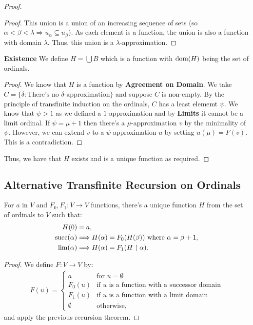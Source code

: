 \begin{proof}
    \begin{proof}
        This union is a union of an increasing sequence of sets
        (so \linebreak 
        $\alpha < \beta < \lambda \Rightarrow u_\alpha \subseteq u_\beta$).
        As each element is a function, the union is also a function with
        domain $\lambda$. Thus, this union is a $\lambda$-approximation.
    \end{proof}
    \vspace{3mm}\noindent
    \textbf{Existence} \newline
    We define $H = \bigcup B$ which is a function with $\operatorname{dom}(H)$ being the set
    of ordinals.
    \begin{proof}
        We know that $H$ is a function by \textbf{Agreement on Domain}.
        We take $C = \{\delta : \text{There's no $\delta$-approximation}\}$
        and suppose $C$ is non-empty. By the principle of transfinite induction
        on the ordinals, $C$ has a least elememt $\psi$. We know that
        $\psi > 1$ as we defined a $1$-approximation and by \textbf{Limits}
        it cannot be a limit ordinal. If $\psi = \mu + 1$ then there's
        a $\mu$-approximation $v$ by the minimality of $\psi$. However,
        we can extend $v$ to a $\psi$-approximation $u$ by setting
        $u(\mu) = F(v)$. This is a contradiction.
    \end{proof}
    \noindent
    Thus, we have that $H$ exists and is a unique function as required.
\end{proof}

\subsection{Alternative Transfinite Recursion on Ordinals}

For $a$ in $V$ and $F_0, F_1 : V \to V$ functions, there's a unique
function $H$ from the set of ordinals to $V$ such that: \begin{align*}
    H(0) &= a, \\
    \operatorname{succ}(\alpha) &\Longrightarrow H(\alpha) = F_0(H(\beta)) \text{ where } \alpha = \beta + 1, \\
    \lim(\alpha) &\Longrightarrow H(\alpha) = F_1(H \upharpoonright \alpha).
\end{align*}

\begin{proof}
    We define $F : V \to V$ by: \begin{align*}
        F(u) = \begin{cases}
            a & \text{for } u = \emptyset \\
            F_0(u) & \text{if } u \text{ is a function with a successor domain} \\
            F_1(u) & \text{if } u \text{ is a function with a limit domain} \\
            \emptyset & \text{otherwise},
        \end{cases}
    \end{align*} and apply the previous recursion theorem.
\end{proof}

